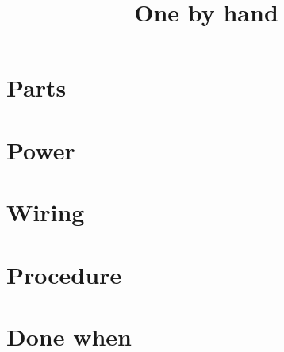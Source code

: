 \documentclass[11pt,a4paper]{article}
\title{One \name{74HC165} by hand}
\author{}
\date{}
\begin{document}
\maketitle

\section*{Parts}

\section*{Power}

\section*{Wiring}

\section*{Procedure}

\section*{Done when}

\revisiontable
\end{document}
